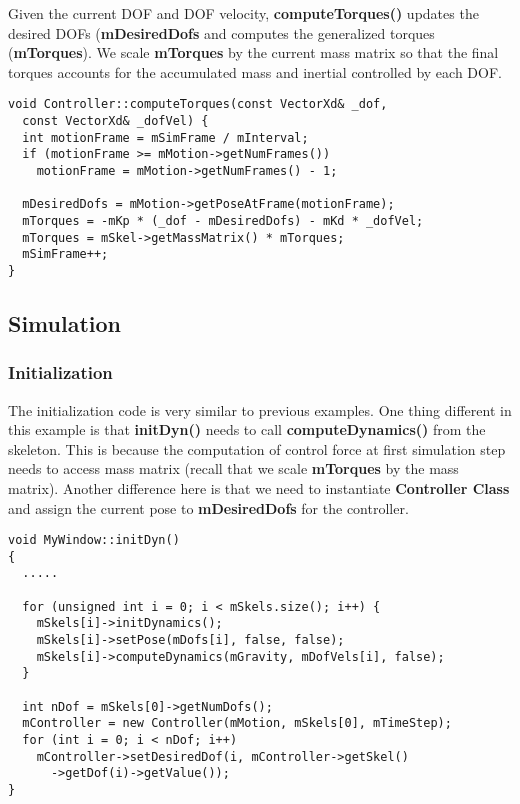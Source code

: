 Given the current DOF and DOF velocity, \textbf{computeTorques()}
updates the desired DOFs (\textbf{mDesiredDofs} and computes the
generalized torques (\textbf{mTorques}). We scale \textbf{mTorques} by
the current mass matrix so that the final torques accounts for the
accumulated mass and inertial controlled by each DOF.

\ttfamily
\begin{lstlisting}[caption=Controller.cpp]
void Controller::computeTorques(const VectorXd& _dof, 
  const VectorXd& _dofVel) {
  int motionFrame = mSimFrame / mInterval;    
  if (motionFrame >= mMotion->getNumFrames())
    motionFrame = mMotion->getNumFrames() - 1;
  
  mDesiredDofs = mMotion->getPoseAtFrame(motionFrame);
  mTorques = -mKp * (_dof - mDesiredDofs) - mKd * _dofVel;
  mTorques = mSkel->getMassMatrix() * mTorques;
  mSimFrame++;
}
\end{lstlisting}
\rmfamily

\subsection{Simulation}

\subsubsection{Initialization}
The initialization code is very similar to previous examples. One
thing different in this example is that \textbf{initDyn()} needs to
call \textbf{computeDynamics()} from the skeleton. This is because the
computation of control force at first simulation step needs to access
mass matrix (recall that we scale \textbf{mTorques} by the mass
matrix). Another difference here is that we need to instantiate
\textbf{Controller Class} and assign the current pose to
\textbf{mDesiredDofs} for the controller.
 
\ttfamily
\begin{lstlisting}[caption=MyWindow.cpp]
void MyWindow::initDyn()
{
  .....

  for (unsigned int i = 0; i < mSkels.size(); i++) {
    mSkels[i]->initDynamics();
    mSkels[i]->setPose(mDofs[i], false, false);
    mSkels[i]->computeDynamics(mGravity, mDofVels[i], false);
  }
  
  int nDof = mSkels[0]->getNumDofs();
  mController = new Controller(mMotion, mSkels[0], mTimeStep);
  for (int i = 0; i < nDof; i++)
    mController->setDesiredDof(i, mController->getSkel()
      ->getDof(i)->getValue());
}
\end{lstlisting}
\rmfamily

